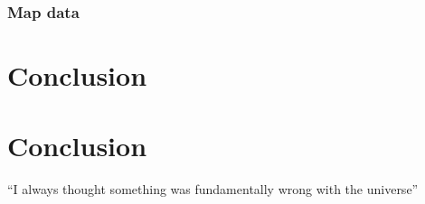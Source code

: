\documentclass[11pt,a4paper]{article}
\begin{document}
\subsubsection{Map data}

\section{Conclusion}

\section{Conclusion}
``I always thought something was fundamentally wrong with the universe'' \citep{hastie01statisticallearning}



\end{document}
